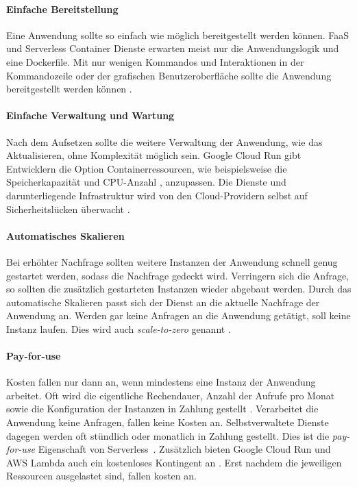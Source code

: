 \paragraph{Einfache Bereitstellung} Eine Anwendung sollte so einfach
wie möglich bereitgestellt werden können.
FaaS und Serverless Container Dienste erwarten meist nur die
Anwendungslogik und eine Dockerfile.
Mit nur wenigen Kommandos und Interaktionen in der Kommandozeile oder
der grafischen Benutzeroberfläche sollte die Anwendung
bereitgestellt werden können \cite{ServerlessTrends}.

\paragraph{Einfache Verwaltung und Wartung} 
Nach dem Aufsetzen sollte die weitere Verwaltung der Anwendung, wie das Aktualisieren,
ohne Komplexität möglich sein. Google Cloud Run gibt Entwicklern die Option
Containerressourcen, wie beispielsweise die Speicherkapazität \cite{CloudRunMemLimits}
und CPU-Anzahl \cite{CloudRunCpuAlloc}, anzupassen. Die Dienste und darunterliegende
Infrastruktur wird von den Cloud-Providern selbst auf Sicherheitslücken überwacht \cite{ServerlessTrends}.

\paragraph{Automatisches Skalieren} Bei erhöhter Nachfrage sollten weitere Instanzen der Anwendung
schnell genug gestartet werden, sodass die Nachfrage gedeckt wird.
Verringern sich die Anfrage, so sollten die zusätzlich gestarteten Instanzen wieder abgebaut werden.
Durch das automatische Skalieren passt sich der Dienst an die aktuelle Nachfrage der Anwendung an.
Werden gar keine Anfragen an die Anwendung getätigt, soll keine Instanz laufen.
Dies wird auch \textit{scale-to-zero} genannt \cite{ServerlessTrends}.

\paragraph{Pay-for-use} Kosten fallen nur dann an, wenn mindestens eine
Instanz der Anwendung arbeitet. Oft wird die eigentliche Rechendauer, Anzahl der
Aufrufe pro Monat sowie die Konfiguration der Instanzen in Zahlung gestellt \cite{ServerlessTrends}.
Verarbeitet die Anwendung keine Anfragen, fallen keine Kosten an.
Selbstverwaltete Dienste dagegen werden oft stündlich oder monatlich in Zahlung gestellt.
Dies ist die \textit{pay-for-use} Eigenschaft von Serverless \cite{Firecracker}.
Zusätzlich bieten Google Cloud Run und AWS Lambda auch ein kostenloses Kontingent an
\cite{CloudRunPricing} \cite{AWSLambda}. Erst nachdem die jeweiligen Ressourcen
ausgelastet sind, fallen kosten an.

